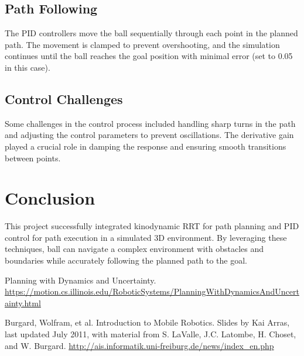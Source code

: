 \documentclass[12pt]{article}
\begin{document}
\subsection{Path Following}
The PID controllers move the ball sequentially through each point in the planned path. The movement is clamped to prevent overshooting, and the simulation continues until the ball reaches the goal position with minimal error (set to 0.05 in this case).

\subsection{Control Challenges}
Some challenges in the control process included handling sharp turns in the path and adjusting the control parameters to prevent oscillations. The derivative gain played a crucial role in damping the response and ensuring smooth transitions between points.

\section{Conclusion}
This project successfully integrated kinodynamic RRT for path planning and PID control for path execution in a simulated 3D environment. By leveraging these techniques, ball can navigate a complex environment with obstacles and boundaries while accurately following the planned path to the goal.

\begin{thebibliography}{}
\raggedright

Planning with Dynamics and Uncertainty. \href{https://motion.cs.illinois.edu/RoboticSystems/PlanningWithDynamicsAndUncertainty.html}
{https://motion.cs.illinois.edu/RoboticSystems/PlanningWithDynamicsAndUncertainty.html}

Burgard, Wolfram, et al. Introduction to Mobile Robotics. Slides by Kai Arras, last updated July 2011, with material from S. LaValle, J.C. Latombe, H. Choset, and W. Burgard. \href{http://ais.informatik.uni-freiburg.de/news/index_en.php}{http://ais.informatik.uni-freiburg.de/news/index\_en.php}


\end{thebibliography}
\end{document}
